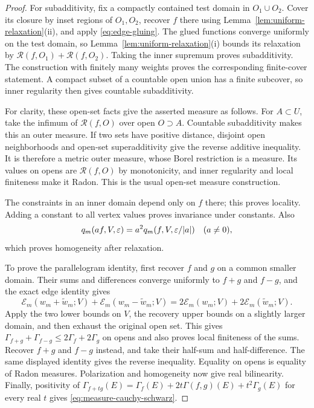 \begin{proof}
For subadditivity, fix a compactly contained test domain in
\(O_1\cup O_2\).  Cover its closure by inset regions of \(O_1,O_2\),
recover \(f\) there using Lemma~\ref{lem:uniform-relaxation}(ii), and
apply \eqref{eq:edge-gluing}.  The glued functions converge uniformly on
the test domain, so Lemma~\ref{lem:uniform-relaxation}(i) bounds its
relaxation by \(\mathcal R(f,O_1)+\mathcal R(f,O_2)\).
Taking the inner supremum proves subadditivity.  The construction with
finitely many weights proves the corresponding finite-cover statement.
A compact subset of a countable open union has a finite subcover, so
inner regularity then gives countable subadditivity.

For clarity, these open-set facts give the asserted measure as follows.
For \(A\subset U\), take the infimum of \(\mathcal R(f,O)\) over open
\(O\supset A\).  Countable subadditivity makes this an outer measure.
If two sets have positive distance, disjoint open neighborhoods and
open-set superadditivity give the reverse additive inequality.  It is
therefore a metric outer measure, whose Borel restriction is a measure.
Its values on opens are \(\mathcal R(f,O)\) by monotonicity, and inner
regularity and local finiteness make it Radon.  This is the usual
open-set measure construction.

The constraints in an inner domain depend only on \(f\) there; this proves
locality.  Adding a constant to all vertex values proves invariance under
constants.  Also
\[
 q_m(af,V,\varepsilon)=a^2q_m(f,V,\varepsilon/\lvert a\rvert)
 \quad(a\ne0),
\]
which proves homogeneity after relaxation.

To prove the parallelogram identity, first recover \(f\) and \(g\) on a
common smaller domain.  Their sums and differences converge uniformly
to \(f+g\) and \(f-g\), and the exact edge identity gives
\[
 \mathcal E_m(w_m+\widetilde w_m;V)
 +\mathcal E_m(w_m-\widetilde w_m;V)
 =2\mathcal E_m(w_m;V)+2\mathcal E_m(\widetilde w_m;V).
\]
Apply the two lower bounds on \(V\), the recovery upper bounds on a
slightly larger domain, and then exhaust the original open set.  This
gives
\(\Gamma_{f+g}+\Gamma_{f-g}\le2\Gamma_f+2\Gamma_g\) on opens and
also proves local finiteness of the sums.  Recover \(f+g\) and \(f-g\)
instead, and take their half-sum and half-difference.  The same displayed
identity gives the reverse inequality.  Equality on opens is equality of
Radon measures.  Polarization and homogeneity now give real bilinearity.
Finally, positivity of
\(\Gamma_{f+t g}(E)=\Gamma_f(E)+2t\Gamma(f,g)(E)+t^2\Gamma_g(E)\)
for every real \(t\) gives \eqref{eq:measure-cauchy-schwarz}.
\end{proof}

